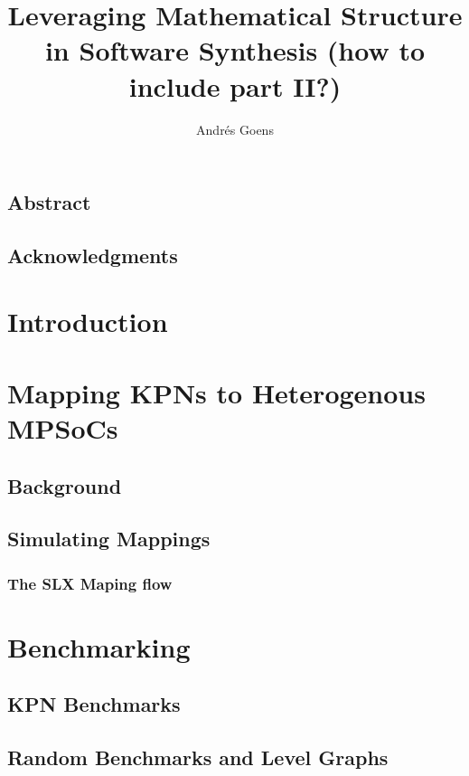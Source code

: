 \documentclass{report}
\title{Leveraging Mathematical Structure in Software Synthesis (how to include part II?)}
\author{Andr\'{e}s Goens}
\begin{document}

\date{}

\maketitle
\clearpage
\section*{Abstract}

\clearpage
\tableofcontents
\clearpage
\section*{Acknowledgments}


\chapter{Introduction}


%
\chapter{Mapping \acsp{KPN} to Heterogenous \acsp{MPSoC}}

\section{Background}

\section{Simulating Mappings}

\subsection{The SLX Maping flow}


\chapter{Benchmarking}

\section{KPN Benchmarks}

\section{Random Benchmarks and Level Graphs}
\end{document}

